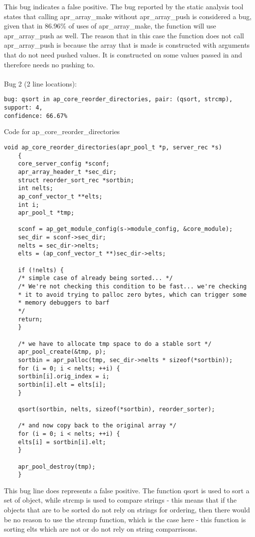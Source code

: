\documentclass[12pt]{article}
\begin{document}
This bug indicates a false positive. The bug reported by the static analysis tool states that calling apr\_array\_make without apr\_array\_push is considered a bug, given that in 86.96\% of uses of apr\_array\_make, the function will use apr\_array\_push as well. The reason that in this case the function does not call apr\_array\_push is because the array that is made is constructed with arguments that do not need pushed values. It is constructed on some values passed in and therefore needs no pushing to.\\\\
Bug 2 (2 line locations):
\begin{lstlisting}
bug: qsort in ap_core_reorder_directories, pair: (qsort, strcmp), support: 4,
confidence: 66.67%
\end{lstlisting}
Code for ap\_core\_reorder\_directories
\begin{lstlisting}
void ap_core_reorder_directories(apr_pool_t *p, server_rec *s)
	{
	core_server_config *sconf;
	apr_array_header_t *sec_dir;
	struct reorder_sort_rec *sortbin;
	int nelts;
	ap_conf_vector_t **elts;
	int i;
	apr_pool_t *tmp;
	
	sconf = ap_get_module_config(s->module_config, &core_module);
	sec_dir = sconf->sec_dir;
	nelts = sec_dir->nelts;
	elts = (ap_conf_vector_t **)sec_dir->elts;
	
	if (!nelts) {
	/* simple case of already being sorted... */
	/* We're not checking this condition to be fast... we're checking
	* it to avoid trying to palloc zero bytes, which can trigger some
	* memory debuggers to barf
	*/
	return;
	}
	
	/* we have to allocate tmp space to do a stable sort */
	apr_pool_create(&tmp, p);
	sortbin = apr_palloc(tmp, sec_dir->nelts * sizeof(*sortbin));
	for (i = 0; i < nelts; ++i) {
	sortbin[i].orig_index = i;
	sortbin[i].elt = elts[i];
	}
	
	qsort(sortbin, nelts, sizeof(*sortbin), reorder_sorter);
	
	/* and now copy back to the original array */
	for (i = 0; i < nelts; ++i) {
	elts[i] = sortbin[i].elt;
	}
	
	apr_pool_destroy(tmp);
	}
\end{lstlisting}

This bug line does represents a false positive. The function qsort is used to sort a set of object, while strcmp is used to compare strings - this means that if the objects that are to be sorted do not rely on strings for ordering, then there would be no reason to use the strcmp function, which is the case here - this function is sorting elts which are not or do not rely on string comparrisons.
\end{document}
